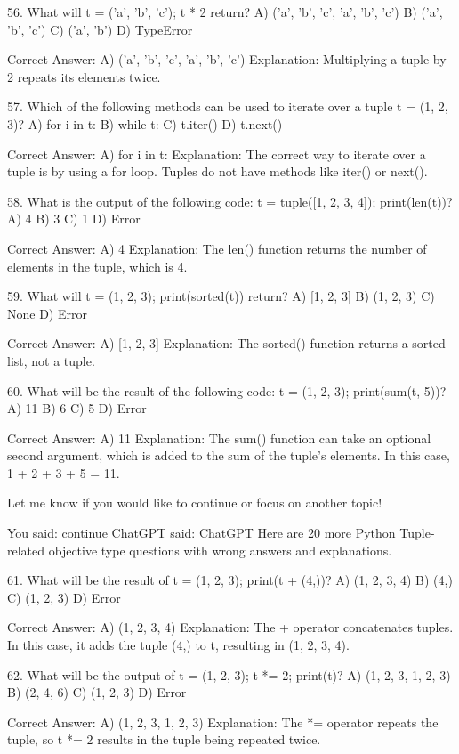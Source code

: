 56. What will t = ('a', 'b', 'c'); t * 2 return?
A) ('a', 'b', 'c', 'a', 'b', 'c')
B) ('a', 'b', 'c')
C) ('a', 'b')
D) TypeError

Correct Answer: A) ('a', 'b', 'c', 'a', 'b', 'c')
Explanation: Multiplying a tuple by 2 repeats its elements twice.

57. Which of the following methods can be used to iterate over a tuple t = (1, 2, 3)?
A) for i in t:
B) while t:
C) t.iter()
D) t.next()

Correct Answer: A) for i in t:
Explanation: The correct way to iterate over a tuple is by using a for loop. Tuples do not have methods like iter() or next().

58. What is the output of the following code: t = tuple([1, 2, 3, 4]); print(len(t))?
A) 4
B) 3
C) 1
D) Error

Correct Answer: A) 4
Explanation: The len() function returns the number of elements in the tuple, which is 4.

59. What will t = (1, 2, 3); print(sorted(t)) return?
A) [1, 2, 3]
B) (1, 2, 3)
C) None
D) Error

Correct Answer: A) [1, 2, 3]
Explanation: The sorted() function returns a sorted list, not a tuple.

60. What will be the result of the following code: t = (1, 2, 3); print(sum(t, 5))?
A) 11
B) 6
C) 5
D) Error

Correct Answer: A) 11
Explanation: The sum() function can take an optional second argument, which is added to the sum of the tuple's elements. In this case, 1 + 2 + 3 + 5 = 11.

Let me know if you would like to continue or focus on another topic!






You said:
continue
ChatGPT said:
ChatGPT
Here are 20 more Python Tuple-related objective type questions with wrong answers and explanations.

61. What will be the result of t = (1, 2, 3); print(t + (4,))?
A) (1, 2, 3, 4)
B) (4,)
C) (1, 2, 3)
D) Error

Correct Answer: A) (1, 2, 3, 4)
Explanation: The + operator concatenates tuples. In this case, it adds the tuple (4,) to t, resulting in (1, 2, 3, 4).

62. What will be the output of t = (1, 2, 3); t *= 2; print(t)?
A) (1, 2, 3, 1, 2, 3)
B) (2, 4, 6)
C) (1, 2, 3)
D) Error

Correct Answer: A) (1, 2, 3, 1, 2, 3)
Explanation: The *= operator repeats the tuple, so t *= 2 results in the tuple being repeated twice.

